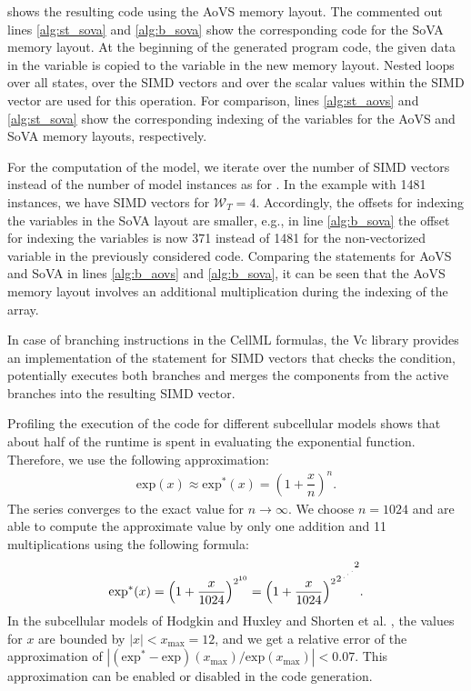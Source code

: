  shows the resulting code using the AoVS memory layout. The commented out lines \ref{alg:st_sova} and \ref{alg:b_sova} show the corresponding code for the SoVA memory layout.
At the beginning of the generated program code, the given data in the  variable is copied to the  variable in the new memory layout. Nested loops over all states, over the SIMD vectors and over the scalar values within the SIMD vector are used for this operation. For comparison, lines \ref{alg:st_aovs} and \ref{alg:st_sova} show the corresponding indexing of the  variables for the AoVS and SoVA memory layouts, respectively.

For the computation of the model, we iterate over the number  of SIMD vectors instead of the number of model instances as for . In the example with 1481 instances, we have  SIMD vectors for $\mathcal{W}_T=4$. 
Accordingly, the offsets for indexing the variables in the SoVA layout are smaller, e.g., in line \ref{alg:b_sova} the offset for indexing the  variables is now 371 instead of 1481 for the non-vectorized variable in the previously considered  code. 
Comparing the statements for AoVS and SoVA in lines \ref{alg:b_aovs} and \ref{alg:b_sova}, it can be seen that the AoVS memory layout involves an additional multiplication during the indexing of the array.

In case of branching instructions in the CellML formulas, the Vc library provides an implementation of the  statement for SIMD vectors that checks the condition, potentially executes both branches and merges the components from the active branches into the resulting SIMD vector.

Profiling the execution of the  code for different subcellular models shows that about half of the runtime is spent in evaluating the exponential function. Therefore, we use the following approximation:
\begin{align*}
  \textrm{exp}(x) \approx \textrm{exp}^\ast(x) = \left( 1 + \dfrac{x}{n}\right)^n.
\end{align*}
The series converges to the exact value for $n\to \infty$. We choose $n=1024$ and are able to compute the approximate value by only one addition and 11 multiplications using the following formula:
\begin{align*}
    \textrm{exp}^\ast(x) = \left( 1 + \dfrac{x}{1024}\right)^{2^{10}} = {{{\left( 1 + \dfrac{x}{1024}\right)^2}^2}^{\scriptsize\iddots}}^2.
\end{align*}
%
In the subcellular models of Hodgkin and Huxley \cite{Hodgkin1952} and Shorten et al. \cite{shorten2007mathematical}, the values for $x$ are bounded by $|x| < x_\text{max} = 12$, and we get a relative error of the approximation of $|(\textrm{exp}^\ast - \textrm{exp})(x_\text{max}) / \textrm{exp}(x_\text{max})| < 0.07.$
This approximation can be enabled or disabled in the code generation.

